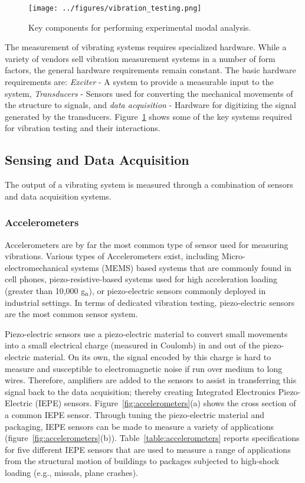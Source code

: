 \documentclass[12pt,letter]{article}
\begin{document}
		
		\begin{figure}[H]
			\centering
			\texttt{[image: ../figures/vibration\_testing.png]}
			\caption{Key components for performing experimental modal analysis.}
			\label{fig:vibration_testing}
		\end{figure} 
		


The measurement of vibrating systems requires specialized hardware. While a variety of vendors sell vibration measurement systems in a number of form factors, the general hardware requirements remain constant. The basic hardware requirements are: \emph{Exciter} - A system to provide a measurable input to the system, \emph{Transducers} - Sensors used for converting the mechanical movements of the structure to signals, and \emph{data acquisition} - Hardware for digitizing the signal generated by the transducers. Figure~\ref{fig:vibration_testing} shows some of the key systems required for vibration testing and their interactions. 



\subsection{Sensing and Data Acquisition}

The output of a vibrating system is measured through a combination of sensors and data acquisition systems. 

\subsubsection{Accelerometers}

Accelerometers are by far the most common type of sensor used for measuring vibrations. Various types of Accelerometers exist, including Micro-electromechanical systems (MEMS) based systems that are commonly found in cell phones, piezo-resistive-based systems used for high acceleration loading (greater than 10,000 g$_\text{n}$), or piezo-electric sensors commonly deployed in industrial settings. In terms of dedicated vibration testing, piezo-electric sensors are the most common sensor system. 

Piezo-electric sensors use a piezo-electric material to convert small movements into a small electrical charge (measured in Coulomb) in and out of the piezo-electric material. On its own, the signal encoded by this charge is hard to measure and susceptible to electromagnetic noise if run over medium to long wires. Therefore, amplifiers are added to the sensors to assist in transferring this signal back to the data acquisition; thereby creating Integrated Electronics Piezo-Electric (IEPE) sensors. Figure~\ref{fig:accelerometers}(a) shows the cross section of a common IEPE sensor. Through tuning the piezo-electric material and packaging, IEPE sensors can be made to measure a variety of applications (figure~\ref{fig:accelerometers}(b)). Table~\ref{table:accelerometers} reports specifications for five different IEPE sensors that are used to measure a range of applications from the structural motion of buildings to packages subjected to high-shock loading (e.g., missals, plane crashes).
\end{document}

